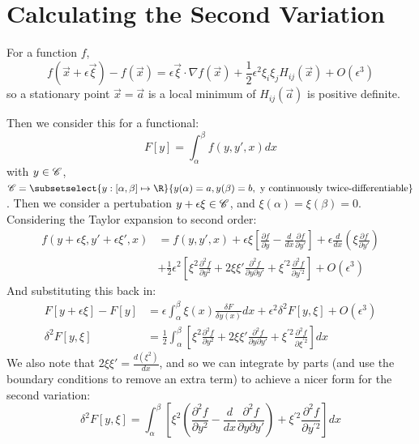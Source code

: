\documentclass[../Main.tex]{subfiles}
\begin{document}
\section{Calculating the Second Variation}
For a function $f$,
\begin{equation*}
    f(\vec{x} + \epsilon \vec{\xi}) - f(\vec{x}) = \epsilon \vec{\xi} \cdot \nabla f(\vec{x}) + \frac{1}{2} \epsilon^2 \xi_i \xi_j H_{ij}(\vec{x}) + O(\epsilon^3)
\end{equation*}
so a stationary point $\vec{x} = \vec{a}$ is a local minimum of $H_{ij}(\vec{a})$ is positive definite.

Then we consider this for a functional:
\begin{equation*}
    F[y] = \int_\alpha^\beta f(y, y', x) dx
\end{equation*}
with $y \in \mathscr{C}$, $\funcset = \subsetselect{y : [\alpha, \beta] \mapsto \R}{y(\alpha) = a, y(\beta) = b, \text{ y continuously twice-differentiable}}$.
Then we consider a pertubation $y + \epsilon \xi \in \mathscr{C}$, and $\xi(\alpha) = \xi(\beta) = 0$.
Considering the Taylor expansion to second order:
\begin{align*}
    f(y + \epsilon \xi, y' + \epsilon \xi', x) &= f(y, y', x) + \epsilon \xi \left[\frac{\partial f}{\partial y} - \frac{d}{dx} \frac{\partial f}{\partial y'}\right] + \epsilon \frac{d}{dx}\left(\xi \frac{\partial f}{\partial y'}\right) \\
    &+ \frac{1}{2} \epsilon^2 \left[\xi^2 \frac{\partial^2 f}{\partial y^2} + 2\xi \xi' \frac{\partial^2 f}{\partial y \partial y'} + \xi^{\prime 2} \frac{\partial^2 f}{\partial y^{\prime 2}}\right] + O(\epsilon^3)
\end{align*}
And substituting this back in:
\begin{align*}
    F[y + \epsilon \xi] - F[y] &= \epsilon \int_\alpha^\beta \xi(x) \frac{\delta F}{\delta y(x)}dx + \epsilon^2 \delta^2 F[y, \xi] + O(\epsilon^3) \\
    \delta^2 F[y, \xi] &= \frac{1}{2} \int_\alpha^\beta \left[\xi^2 \frac{\partial^2 f}{\partial y^2} + 2\xi\xi' \frac{\partial^2 f}{\partial y \partial y'} + \xi^{\prime 2} \frac{\partial^2 f}{\partial \xi^{\prime 2}}\right]dx
\end{align*}
We also note that $2\xi\xi' = \frac{d(\xi^2)}{dx}$, and so we can integrate by parts (and use the boundary conditions to remove an extra term) to achieve a nicer form for the second variation:
\begin{equation}
    \delta^2 F[y, \xi] = \int_\alpha^\beta \left[\xi^2 \left(\frac{\partial^2 f}{\partial y^2} - \frac{d}{dx} \frac{\partial^2 f}{\partial y \partial y'}\right) + \xi^{\prime 2} \frac{\partial^2 f}{\partial y^{\prime 2}}\right]dx
    \label{eqnSecondVariation}
\end{equation}
\end{document}
